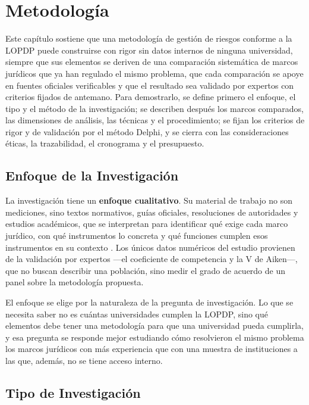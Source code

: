 \chapter{Metodología}
\label{chap:metodologia}

Este capítulo sostiene que una metodología de gestión de riesgos conforme a la LOPDP puede construirse con rigor sin datos internos de ninguna universidad, siempre que sus elementos se deriven de una comparación sistemática de marcos jurídicos que ya han regulado el mismo problema, que cada comparación se apoye en fuentes oficiales verificables y que el resultado sea validado por expertos con criterios fijados de antemano. Para demostrarlo, se define primero el enfoque, el tipo y el método de la investigación; se describen después los marcos comparados, las dimensiones de análisis, las técnicas y el procedimiento; se fijan los criterios de rigor y de validación por el método Delphi, y se cierra con las consideraciones éticas, la trazabilidad, el cronograma y el presupuesto.

\section{Enfoque de la Investigación}
\label{sec:enfoque}

La investigación tiene un \textbf{enfoque cualitativo}. Su material de trabajo no son mediciones, sino textos normativos, guías oficiales, resoluciones de autoridades y estudios académicos, que se interpretan para identificar qué exige cada marco jurídico, con qué instrumentos lo concreta y qué funciones cumplen esos instrumentos en su contexto \cite{hernandez2018metodologia}. Los únicos datos numéricos del estudio provienen de la validación por expertos ---el coeficiente de competencia y la V de Aiken---, que no buscan describir una población, sino medir el grado de acuerdo de un panel sobre la metodología propuesta.

El enfoque se elige por la naturaleza de la pregunta de investigación. Lo que se necesita saber no es cuántas universidades cumplen la LOPDP, sino qué elementos debe tener una metodología para que una universidad pueda cumplirla, y esa pregunta se responde mejor estudiando cómo resolvieron el mismo problema los marcos jurídicos con más experiencia que con una muestra de instituciones a las que, además, no se tiene acceso interno.

\section{Tipo de Investigación}

